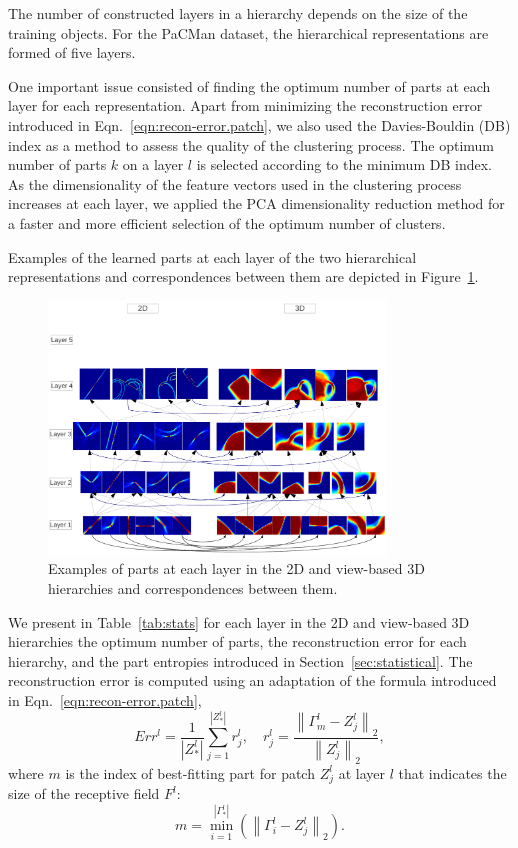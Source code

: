 \documentclass[runningheads]{llncs}
\begin{document}
The number of constructed layers in a hierarchy depends on the size of the training objects. For the PaCMan dataset, the hierarchical representations are formed of five layers. 

One important issue consisted of finding the optimum number of parts at each layer for each representation. Apart from minimizing the reconstruction error introduced in Eqn.~\ref{eqn:recon-error.patch}, we also used the Davies-Bouldin (DB) index \cite{Bouldin97} as a method to assess the quality of the clustering process. The optimum number of parts $k$ on a layer $l$ is selected according to the minimum DB index. As the dimensionality of the feature vectors used in the clustering process increases at each layer, we applied the PCA dimensionality reduction method for a faster and more efficient selection of the optimum number of clusters.

Examples of the learned parts at each layer of the two hierarchical representations and correspondences between them are depicted in Figure~\ref{hierarchy}.

\begin{figure}
\begin{center}
\includegraphics[width=0.8\textwidth]{hierarchy}
\end{center}
\caption{Examples of parts at each layer in the 2D and view-based 3D hierarchies and correspondences between them.}
\label{hierarchy}
\end{figure}

We present in Table~\ref{tab:stats} for each layer in the 2D and view-based 3D hierarchies the optimum number of parts, the reconstruction error for each hierarchy, and the part entropies introduced in Section~\ref{sec:statistical}. The reconstruction error is computed using an adaptation of the formula introduced in Eqn.~\ref{eqn:recon-error.patch},
\begin{equation}
 Err^l = \frac{1}{|Z_*^l|} \sum_{j=1}^{|Z_*^l|} r_j^l,\quad
 r_j^l = \frac{\left\|\Gamma_m^l-Z_j^l\right\|_2}{\left\|Z_j^l\right\|_2},
 \label{eq:r}
\end{equation}
where $m$ is the index of best-fitting part for patch $Z_j^l$ at layer $l$ that indicates the size of the receptive field $F^l$:
 \begin{equation}
 m=\min_{i=1}^{|\Gamma_*^l|}(\left\|\Gamma_i^l-Z_j^l\right\|_2).
\end{equation}
\end{document}
